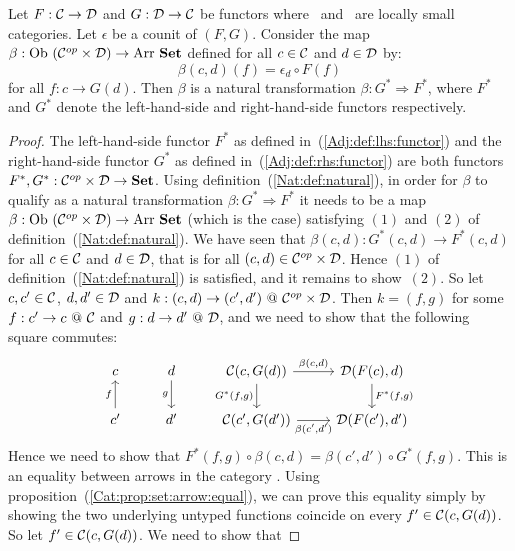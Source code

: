 \begin{prop}\label{Adj:prop:natural:right:left}
    Let $F:\mbox{$\cal C$}\to\mbox{$\cal D$}$ and $G:\mbox{$\cal D$}\to\mbox{$\cal C$}$ be functors where \Cat\ and \Dat\ 
    are locally small categories. Let $\epsilon$ be a counit of $(F,G)$. 
    Consider the map $\beta:\ob\ (\Cop\times\Dat)\to\arr\ \Set$ defined 
    for all $c\in\mbox{$\cal C$}$ and $d\in\mbox{$\cal D$}$ by:
        \[
            \beta(c,d)(f)=\epsilon_{d}\circ F(f)
        \]
    for all $f:c\to G(d)$. Then $\beta$ is a natural transformation 
    $\beta:G^{*}\Rightarrow F^{*}$, where $F^{*}$ and $G^{*}$ denote
    the left-hand-side and right-hand-side functors respectively.
\end{prop}
\begin{proof}
    The left-hand-side functor $F^{*}$ as defined in~(\ref{Adj:def:lhs:functor})
    and the right-hand-side functor $G^{*}$ as defined 
    in~(\ref{Adj:def:rhs:functor}) are both functors 
    $F^{*},G^{*}:\mbox{${\cal C}^{op}$}\times\mbox{$\cal D$}\to\mbox{\bf Set}$. Using definition~(\ref{Nat:def:natural}),
    in order for $\beta$ to qualify as a natural transformation 
    $\beta:G^{*}\Rightarrow F^{*}$ it needs to be a map
    $\beta:\ob\ (\Cop\times\Dat)\to\arr\ \Set$ (which is the case) satisfying
    $(1)$ and $(2)$ of definition~(\ref{Nat:def:natural}). We have
    seen that $\beta(c,d):G^{*}(c,d)\to F^{*}(c,d)$ for all $c\in\mbox{$\cal C$}$
    and $d\in\mbox{$\cal D$}$, that is for all $(c,d)\in\mbox{${\cal C}^{op}$}\times\mbox{$\cal D$}$. Hence $(1)$ of
    definition~(\ref{Nat:def:natural}) is satisfied, and it remains to show~$(2)$.
    So let $c,c'\in\mbox{$\cal C$}$, $d,d'\in\mbox{$\cal D$}$ and $k:(c,d)\to(c',d')\ @\ \mbox{${\cal C}^{op}$}\times\mbox{$\cal D$}$.
    Then $k=(f,g)$ for some $f:c'\to c\ @\ \mbox{$\cal C$}$ and $g:d \to d'\ @\ \mbox{$\cal D$}$, and
    we need to show that the following square commutes:
    \[
        \begin{tikzcd}
            c
            &d\arrow[d,swap, "g"]
            &\Cat(c,G(d))\arrow[r, "\beta\mbox{$(c,d)$}"]
             \arrow[d, swap,"G^{*}\mbox{$(f,g)$}"]
            &\Dat(F(c),d)
             \arrow[d, "F^{*}\mbox{$(f,g)$}"]
            \\
            c'\arrow[u, "f"]
            &d'
            &\Cat(c',G(d'))\arrow[r, swap, "\beta\mbox{$(c',d')$}"]
            &\Dat(F(c'),d')
        \end{tikzcd}
    \]
    Hence we need to show that $F^{*}(f,g)\circ\beta(c,d)=\beta(c',d')\circ
    G^{*}(f,g)$. This is an equality between arrows in the category \Set. Using
    proposition~(\ref{Cat:prop:set:arrow:equal}), we can prove this equality
    simply by showing the two underlying untyped functions coincide on 
    every $f'\in\mbox{$\cal C$}(c,G(d))$. So let $f'\in\mbox{$\cal C$}(c,G(d))$. We need to show that

\end{proof}
